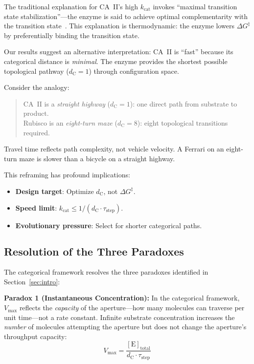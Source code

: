 \documentclass[twocolumn,amsmath,amssymb,aps,prb,superscriptaddress,longbibliography]{revtex4-2}
\newcommand{\dC}{d_{\mathrm{C}}}
\newcommand{\kcat}{k_{\mathrm{cat}}}
\newcommand{\Vmax}{V_{\mathrm{max}}}
\newcommand{\DG}{\Delta G^{\ddagger}}
\begin{document}
The traditional explanation for CA~II's high $\kcat$ invokes ``maximal transition state stabilization''---the enzyme is said to achieve optimal complementarity with the transition state~\cite{Pauling1946, Fersht1999}. This explanation is thermodynamic: the enzyme lowers $\DG$ by preferentially binding the transition state.

Our results suggest an alternative interpretation: CA~II is ``fast'' because its categorical distance is \emph{minimal}. The enzyme provides the shortest possible topological pathway ($\dC = 1$) through configuration space.

Consider the analogy:
\begin{quote}
CA~II is a \emph{straight highway} ($\dC = 1$): one direct path from substrate to product.\\
Rubisco is an \emph{eight-turn maze} ($\dC = 8$): eight topological transitions required.
\end{quote}

Travel time reflects path complexity, not vehicle velocity. A Ferrari on an eight-turn maze is slower than a bicycle on a straight highway.

This reframing has profound implications:
\begin{itemize}
\item \textbf{Design target}: Optimize $\dC$, not $\DG$.
\item \textbf{Speed limit}: $\kcat \leq 1/(\dC \cdot \tau_{\text{step}})$.
\item \textbf{Evolutionary pressure}: Select for shorter categorical paths.
\end{itemize}

\subsection{Resolution of the Three Paradoxes}

The categorical framework resolves the three paradoxes identified in Section~\ref{sec:intro}:

\textbf{Paradox 1 (Instantaneous Concentration):} In the categorical framework, $\Vmax$ reflects the \emph{capacity} of the aperture---how many molecules can traverse per unit time---not a rate constant. Infinite substrate concentration increases the \emph{number} of molecules attempting the aperture but does not change the aperture's throughput capacity:
\begin{equation}
\Vmax = \frac{[\text{E}]_{\text{total}}}{\dC \cdot \tau_{\text{step}}}
\end{equation}
\end{document}
